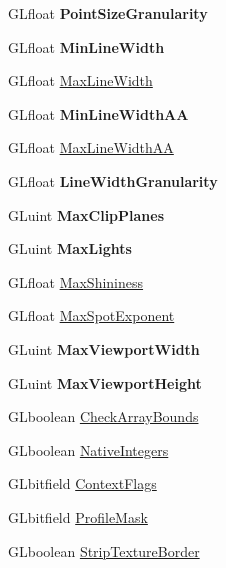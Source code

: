 \begin{DoxyCompactItemize}
G\+Lfloat {\bfseries Point\+Size\+Granularity}
\item 
\mbox{\label{structgl__constants_adfba77e915e828830bbc3ccc03d48234}} 
G\+Lfloat {\bfseries Min\+Line\+Width}
\item 
G\+Lfloat \hyperlink{structgl__constants_aed14463a12a2a26d714c58f80f68b210}{Max\+Line\+Width}
\item 
\mbox{\label{structgl__constants_a834c475f2fff52ddf6a8b7c77ac772d0}} 
G\+Lfloat {\bfseries Min\+Line\+Width\+AA}
\item 
G\+Lfloat \hyperlink{structgl__constants_aad877d8947bbe500f3c2f64d8ba38794}{Max\+Line\+Width\+AA}
\item 
\mbox{\label{structgl__constants_a77f2247464d1020ae8b86369a450c7fe}} 
G\+Lfloat {\bfseries Line\+Width\+Granularity}
\item 
\mbox{\label{structgl__constants_ae554390735aed342cabee0374cfa589d}} 
G\+Luint {\bfseries Max\+Clip\+Planes}
\item 
\mbox{\label{structgl__constants_ac4e217e07ae9bc49e31db13241506712}} 
G\+Luint {\bfseries Max\+Lights}
\item 
G\+Lfloat \hyperlink{structgl__constants_a8a1123059609f76e12e89222089fe3a8}{Max\+Shininess}
\item 
G\+Lfloat \hyperlink{structgl__constants_aaadb4715de0ae0053f0061a7c84fbc5c}{Max\+Spot\+Exponent}
\item 
\mbox{\label{structgl__constants_aa7d2b3cffaf2d585975d4b6d716c223b}} 
G\+Luint {\bfseries Max\+Viewport\+Width}
\item 
\mbox{\label{structgl__constants_a825906f76033bc9934262e0f4cdd799d}} 
G\+Luint {\bfseries Max\+Viewport\+Height}
\item 
G\+Lboolean \hyperlink{structgl__constants_a79dcbb047fa8daa7a56f0c5079a08f84}{Check\+Array\+Bounds}
\item 
G\+Lboolean \hyperlink{structgl__constants_ae1dbf078a93917887e1cb293e4068a4a}{Native\+Integers}
\item 
G\+Lbitfield \hyperlink{structgl__constants_a79529ba4f3e4a008acff61038e524394}{Context\+Flags}
\item 
G\+Lbitfield \hyperlink{structgl__constants_a5cabfb4ba96ee1866f0aa1c10368b4d4}{Profile\+Mask}
\item 
G\+Lboolean \hyperlink{structgl__constants_a9a417df99412d27e8b0b700f8793c42b}{Strip\+Texture\+Border}
\end{DoxyCompactItemize}


